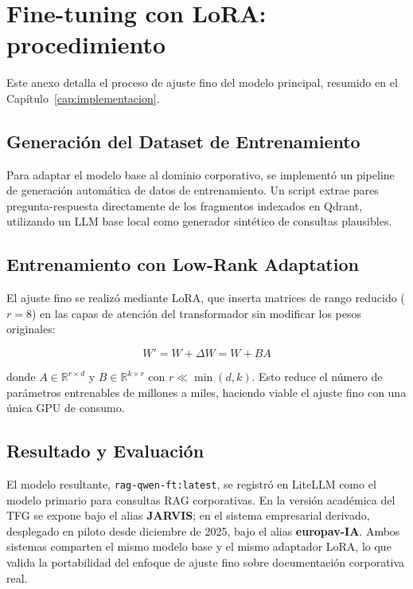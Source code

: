\chapter{Fine-tuning con LoRA: procedimiento}
\label{anexo:finetuning}

Este anexo detalla el proceso de ajuste fino del modelo principal, resumido en el Capítulo~\ref{cap:implementacion}.

\section{Generación del Dataset de Entrenamiento}

Para adaptar el modelo base al dominio corporativo, se implementó un pipeline de generación automática de datos de entrenamiento. Un script extrae pares pregunta-respuesta directamente de los fragmentos indexados en Qdrant, utilizando un LLM base local como generador sintético de consultas plausibles.

\section{Entrenamiento con Low-Rank Adaptation}

El ajuste fino se realizó mediante LoRA, que inserta matrices de rango reducido ($r=8$) en las capas de atención del transformador sin modificar los pesos originales:

\begin{equation}
W' = W + \Delta W = W + BA
\end{equation}

donde $A \in \mathbb{R}^{r \times d}$ y $B \in \mathbb{R}^{k \times r}$ con $r \ll \min(d,k)$. Esto reduce el número de parámetros entrenables de millones a miles, haciendo viable el ajuste fino con una única GPU de consumo.

\section{Resultado y Evaluación}

El modelo resultante, \texttt{rag-qwen-ft:latest}, se registró en LiteLLM como el modelo primario para consultas RAG corporativas. En la versión académica del TFG se expone bajo el alias \textbf{JARVIS}; en el sistema empresarial derivado, desplegado en piloto desde diciembre de 2025, bajo el alias \textbf{europav-IA}. Ambos sistemas comparten el mismo modelo base y el mismo adaptador LoRA, lo que valida la portabilidad del enfoque de ajuste fino sobre documentación corporativa real.

